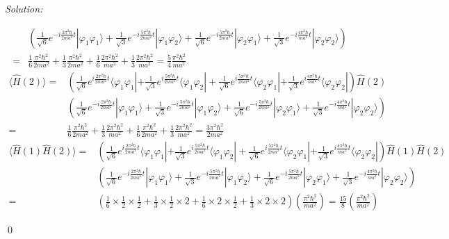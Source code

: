 \documentclass[12pt,a4paper]{article}
\newenvironment{sol}
    {\emph{Solution:}
    }
    {
    \qed
    }
\begin{document}
\begin{sol}
\begin{itemize}
\begin{itemize}
\begin{align}
\nonumber&\left(\frac{1}{\sqrt{6}}e^{-i\frac{2\pi^2\hbar}{2ma^2}t}|\varphi_1\varphi_1\rangle+\frac{1}{\sqrt{3}}e^{-i\frac{5\pi^2\hbar}{2ma^2}t}|\varphi_1\varphi_2\rangle+\frac{1}{\sqrt{6}}e^{-i\frac{5\pi^2\hbar}{2ma^2}t}|\varphi_2\varphi_1\rangle+\frac{1}{\sqrt{3}}e^{-i\frac{4\pi^2\hbar}{ma^2}t}|\varphi_2\varphi_2\rangle\right)\\
=&\frac{1}{6}\frac{\pi^2\hbar^2}{2ma^2}+\frac{1}{3}\frac{\pi^2\hbar^2}{2ma^2}+\frac{1}{6}\frac{2\pi^2\hbar^2}{ma^2}+\frac{1}{3}\frac{2\pi^2\hbar^2}{ma^2}=\frac{5}{4}\frac{\pi^2\hbar^2}{ma^2}
\end{align}
\begin{align}
\nonumber\langle\hat{H}(2)\rangle=&\left(\frac{1}{\sqrt{6}}e^{i\frac{2\pi^2\hbar}{2ma^2}t}\langle\varphi_1\varphi_1|+\frac{1}{\sqrt{3}}e^{i\frac{5\pi^2\hbar}{2ma^2}t}\langle\varphi_1\varphi_2|+\frac{1}{\sqrt{6}}e^{i\frac{5\pi^2\hbar}{2ma^2}t}\langle\varphi_2\varphi_1|+\frac{1}{\sqrt{3}}e^{i\frac{4\pi^2\hbar}{ma^2}t}\langle\varphi_2\varphi_2|\right)\hat{H}(2)\\
\nonumber&\left(\frac{1}{\sqrt{6}}e^{-i\frac{2\pi^2\hbar}{2ma^2}t}|\varphi_1\varphi_1\rangle+\frac{1}{\sqrt{3}}e^{-i\frac{5\pi^2\hbar}{2ma^2}t}|\varphi_1\varphi_2\rangle+\frac{1}{\sqrt{6}}e^{-i\frac{5\pi^2\hbar}{2ma^2}t}|\varphi_2\varphi_1\rangle+\frac{1}{\sqrt{3}}e^{-i\frac{4\pi^2\hbar}{ma^2}t}|\varphi_2\varphi_2\rangle\right)\\
=&\frac{1}{6}\frac{\pi^2\hbar^2}{2ma^2}+\frac{1}{3}\frac{2\pi^2\hbar^2}{ma^2}+\frac{1}{6}\frac{\pi^2\hbar^2}{2ma^2}+\frac{1}{3}\frac{2\pi^2\hbar^2}{ma^2}=\frac{3\pi^2\hbar^2}{2ma^2}
\end{align}
\begin{align}
\nonumber\langle\hat{H}(1)\hat{H}(2)\rangle=&\left(\frac{1}{\sqrt{6}}e^{i\frac{2\pi^2\hbar}{2ma^2}t}\langle\varphi_1\varphi_1|+\frac{1}{\sqrt{3}}e^{i\frac{5\pi^2\hbar}{2ma^2}t}\langle\varphi_1\varphi_2|+\frac{1}{\sqrt{6}}e^{i\frac{5\pi^2\hbar}{2ma^2}t}\langle\varphi_2\varphi_1|+\frac{1}{\sqrt{3}}e^{i\frac{4\pi^2\hbar}{ma^2}t}\langle\varphi_2\varphi_2|\right)\hat{H}(1)\hat{H}(2)\\
\nonumber&\left(\frac{1}{\sqrt{6}}e^{-i\frac{2\pi^2\hbar}{2ma^2}t}|\varphi_1\varphi_1\rangle+\frac{1}{\sqrt{3}}e^{-i\frac{5\pi^2\hbar}{2ma^2}t}|\varphi_1\varphi_2\rangle+\frac{1}{\sqrt{6}}e^{-i\frac{5\pi^2\hbar}{2ma^2}t}|\varphi_2\varphi_1\rangle+\frac{1}{\sqrt{3}}e^{-i\frac{4\pi^2\hbar}{ma^2}t}|\varphi_2\varphi_2\rangle\right)\\
=&\left(\frac{1}{6}\times\frac{1}{2}\times\frac{1}{2}+\frac{1}{3}\times\frac{1}{2}\times2+\frac{1}{6}\times2\times\frac{1}{2}+\frac{1}{3}\times2\times2\right)\left(\frac{\pi^2\hbar^2}{ma^2}\right)=\frac{15}{8}\left(\frac{\pi^2\hbar^2}{ma^2}\right)

\end{align}
\end{itemize}
\end{itemize}
\end{sol}
\end{document}
